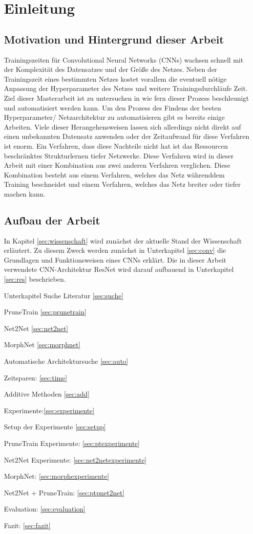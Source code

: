 \chapter{Einleitung}
\label{sec:EinleitungGesamt}

\section{Motivation und Hintergrund dieser Arbeit}
\color{blue1}
Trainingszeiten für Convolutional Neural Networks (CNNs) wachsen schnell mit der Komplexität des Datensatzes und der Größe des Netzes. Neben der Trainingszeit eines bestimmten Netzes kostet vorallem die eventuell nötige Anpassung der Hyperparameter des Netzes und weitere Trainingsdurchläufe Zeit. Ziel dieser Masterarbeit ist zu untersuchen in wie fern dieser Prozess beschleunigt und automatisiert werden kann. Um den Prozess des Findens der besten Hyperparameter/ Netzarchitektur zu automatisieren gibt es bereits einige Arbeiten. Viele dieser Herangehensweisen lassen sich allerdings nicht direkt auf einen unbekannten Datensatz anwenden oder der Zeitaufwand für diese Verfahren ist enorm. Ein Verfahren, dass diese Nachteile nicht hat ist das Ressourcen beschränktes Strukturlernen tiefer Netzwerke. Diese Verfahren wird in dieser Arbeit mit einer Kombination aus zwei anderen Verfahren verglichen. Diese Kombination besteht aus einem Verfahren, welches das Netz währenddem Training beschneidet und einem Verfahren, welches das Netz breiter oder tiefer machen kann.




\section{Aufbau der Arbeit}
In Kapitel \ref{sec:wissenschaft} wird zunächst der aktuelle Stand der Wissenschaft erläutert. Zu diesem Zweck werden zunächst in Unterkapitel \ref{sec:conv} die Grundlagen und Funktionsweisen eines CNNs erklärt. Die in dieser Arbeit verwendete CNN-Architektur ResNet wird darauf aufbauend in Unterkapitel \ref{sec:res} beschrieben.


Unterkapitel Suche Literatur \ref{sec:suche}

PruneTrain \ref{sec:prunetrain}

Net2Net \ref{sec:net2net}

MorphNet \ref{sec:morphnet}

Automatische Architektursuche \ref{sec:auto}

Zeitsparen: \ref{sec:time}

Additive Methoden \ref{sec:add}

Experimente:\ref{sec:experimente}

Setup der Experimente \ref{sec:setup}

PruneTrain Experimente: \ref{sec:ptexperimente}

Net2Net Experimente: \ref{sec:net2netexperimente}

MorphNet: \ref{sec:morphexperimente}

Net2Net + PruneTrain: \ref{sec:ptpnet2net}

Evaluation: \ref{sec:evaluation}

Fazit: \ref{sec:fazit}
\color{black}
